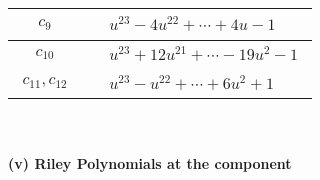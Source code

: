 \documentclass[1p]{elsarticle_modified}
\theoremstyle{definition}
\begin{document}
\begin{tabular}{m{50pt}|m{274pt}}
\hline $$\begin{aligned}c_{9}\end{aligned}$$&$\begin{aligned}
&u^{23}-4 u^{22}+\cdots+4 u-1
\end{aligned}$\\
\hline $$\begin{aligned}c_{10}\end{aligned}$$&$\begin{aligned}
&u^{23}+12 u^{21}+\cdots-19 u^2-1
\end{aligned}$\\
\hline $$\begin{aligned}c_{11},c_{12}\end{aligned}$$&$\begin{aligned}
&u^{23}- u^{22}+\cdots+6 u^2+1
\end{aligned}$\\
\hline
\end{tabular}\\~\\
\newpage\renewcommand{\arraystretch}{1}
\flushleft \textbf{(v) Riley Polynomials at the component}\newline \\
\end{document}
